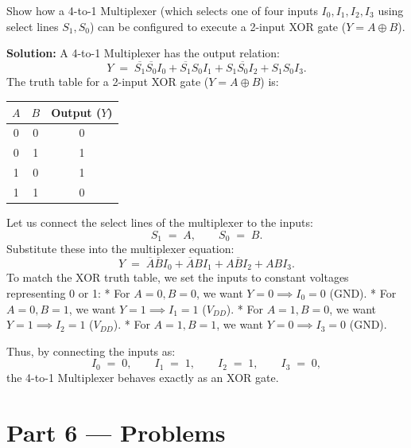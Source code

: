 \documentclass[12pt, a4paper]{book}
\begin{document}
\begin{problembox}
\begin{enumerate}[label=\textbf{E\arabic*.}]
        Show how a 4-to-1 Multiplexer (which selects one of four inputs $I_0, I_1, I_2, I_3$ using select lines $S_1, S_0$) can be configured to execute a 2-input XOR gate ($Y = A \oplus B$).
        
        \textbf{Solution:}
        A 4-to-1 Multiplexer has the output relation:
        \[
          Y \;=\; \overline{S_1}\overline{S_0} I_0 + \overline{S_1} S_0 I_1 + S_1 \overline{S_0} I_2 + S_1 S_0 I_3.
        \]
        The truth table for a 2-input XOR gate ($Y = A \oplus B$) is:
        \begin{center}
        \begin{tabular}{ccc}
          \toprule
          \textbf{$A$} & \textbf{$B$} & \textbf{Output ($Y$)} \\
          \midrule
          0 & 0 & 0 \\
          0 & 1 & 1 \\
          1 & 0 & 1 \\
          1 & 1 & 0 \\
          \bottomrule
        \end{tabular}
        \end{center}
        Let us connect the select lines of the multiplexer to the inputs:
        \[
          S_1 \;=\; A, \qquad S_0 \;=\; B.
        \]
        Substitute these into the multiplexer equation:
        \[
          Y \;=\; \overline{A}\overline{B} I_0 + \overline{A} B I_1 + A \overline{B} I_2 + A B I_3.
        \]
        To match the XOR truth table, we set the inputs to constant voltages representing 0 or 1:
        * For $A=0, B=0$, we want $Y=0 \implies I_0 = 0$ (GND).
        * For $A=0, B=1$, we want $Y=1 \implies I_1 = 1$ ($V_{DD}$).
        * For $A=1, B=0$, we want $Y=1 \implies I_2 = 1$ ($V_{DD}$).
        * For $A=1, B=1$, we want $Y=0 \implies I_3 = 0$ (GND).
        
        Thus, by connecting the inputs as:
        \[
          I_0 \;=\; 0, \qquad I_1 \;=\; 1, \qquad I_2 \;=\; 1, \qquad I_3 \;=\; 0,
        \]
        the 4-to-1 Multiplexer behaves exactly as an XOR gate.
\end{enumerate}
\end{problembox}

\newpage

\section{Part 6 --- Problems}
\end{document}
